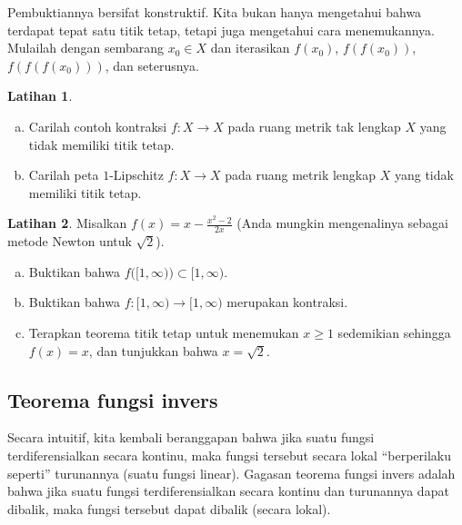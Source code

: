 \documentclass[12pt,openany]{book}
\newcommand{\myquote}[1]{``#1''}
\theoremstyle{plain}
\theoremstyle{remark}
\theoremstyle{definition}
\newenvironment{exbox}{%
    \def\FrameCommand{\vrule width 1pt \relax\hspace{10pt}}%
    \MakeFramed{\advance\hsize-\width\FrameRestore}%
}{%
    \endMakeFramed
}
\newenvironment{exparts}{%
    \leavevmode\begin{enumerate}[a),noitemsep,topsep=0pt,parsep=0pt,partopsep=0pt]
}{%
    \end{enumerate}
}
\theoremstyle{exercise}
\newtheorem{exercise}{Latihan}[section]
\theoremstyle{example}
\newcommand{\thmref}[1]{\hyperref[#1]{Teorema~\ref*{#1}}}
\begin{document}
Pembuktiannya bersifat konstruktif.  Kita bukan hanya mengetahui
bahwa terdapat tepat satu titik tetap, tetapi juga mengetahui cara menemukannya.  Mulailah dengan
sembarang $x_0 \in X$ dan iterasikan $f(x_0)$,
$f(f(x_0))$,
$f(f(f(x_0)))$, dan seterusnya.

\begin{exbox}
\begin{exercise}
\begin{exparts}
\item
Carilah contoh kontraksi $f \colon X \to X$
pada ruang metrik tak lengkap $X$ yang tidak memiliki
titik tetap.
\item
Carilah peta $1$-Lipschitz $f \colon X \to X$ pada ruang metrik lengkap $X$ yang tidak memiliki titik tetap.
\end{exparts}
\end{exercise}

\begin{exercise}
Misalkan $f(x) = x-\frac{x^2-2}{2x}$ (Anda mungkin mengenalinya sebagai metode Newton untuk
$\sqrt{2}$).
\begin{exparts}
\item
Buktikan bahwa $f\bigl([1,\infty)\bigr) \subset [1,\infty)$.
\item
Buktikan bahwa $f \colon [1,\infty) \to [1,\infty)$ merupakan kontraksi.
\item
Terapkan teorema titik tetap untuk menemukan $x \geq 1$ sedemikian sehingga
$f(x) = x$, dan tunjukkan bahwa $x = \sqrt{2}$.
\end{exparts}
\end{exercise}
\end{exbox}

\subsection{Teorema fungsi invers}
\label{subsec:svinvfuncthm}

Secara intuitif, kita kembali beranggapan bahwa jika suatu fungsi terdiferensialkan secara kontinu, maka fungsi tersebut
secara lokal \myquote{berperilaku seperti} turunannya (suatu fungsi linear).
Gagasan teorema fungsi invers adalah bahwa jika suatu fungsi
terdiferensialkan secara kontinu dan turunannya dapat dibalik, maka fungsi tersebut
dapat dibalik (secara lokal).
\end{document}
